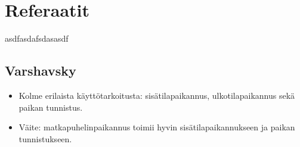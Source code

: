 \documentclass[a4paper]{scrartcl}
\begin{document}
\section{Referaatit}
asdfasdafsdasasdf

\subsection{Varshavsky \cite{varshavsky2005gsm}}
\begin{itemize}
  \item Kolme erilaista käyttötarkoitusta: sisätilapaikannus, ulkotilapaikannus
    sekä paikan tunnistus.
  \item Väite: matkapuhelinpaikannus toimii hyvin sisätilapaikannukseen ja
    paikan tunnistukseen.
\end{itemize}
\end{document}
